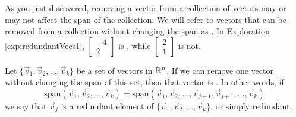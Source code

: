 \documentclass{ximera}
\begin{document}
As you just discovered, removing a vector from a collection of vectors may or may not affect the span of the collection.  We will refer to vectors that can be removed from a collection without changing the span as .  In Exploration \ref{exp:redundantVecs1}, $\begin{bmatrix}-4\\2\end{bmatrix}$ is , while $\begin{bmatrix}2\\1\end{bmatrix}$ is not.

\begin{definition}\label{def:redundant}
Let $\{\vec{v}_1,\vec{v}_2,\dots,\vec{v}_k\}$ be a set of vectors in $\mathbb{R}^n$.  If we can remove one vector without changing the span of this set, then that vector is .  In other words, if $$\mbox{span}\left(\vec{v}_1,\vec{v}_2,\dots,\vec{v}_k\right)=\mbox{span}\left(\vec{v}_1,\vec{v}_2,\dots,\vec{v}_{j-1},\vec{v}_{j+1},\dots,\vec{v}_k\right)$$ we say that $\vec{v}_j$ is a redundant element of $\{\vec{v}_1,\vec{v}_2,\dots,\vec{v}_k\}$, or simply redundant.
\end{definition}
\end{document}
